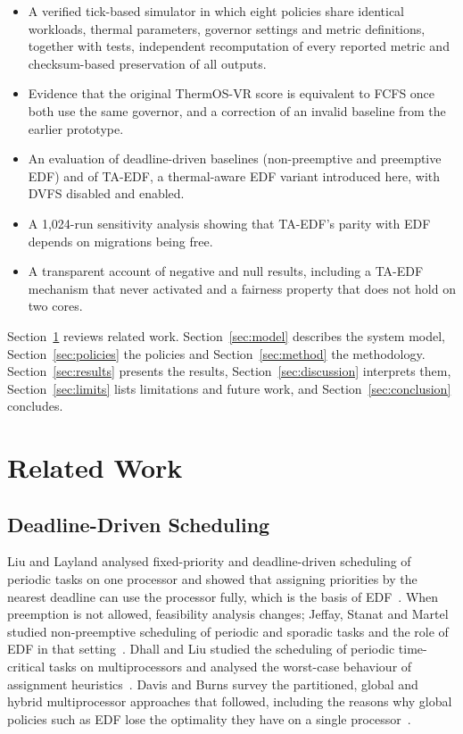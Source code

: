 \documentclass[conference]{IEEEtran}
\begin{document}
\begin{itemize}
\item A verified tick-based simulator in which eight policies share identical workloads, thermal parameters, governor settings and metric definitions, together with tests, independent recomputation of every reported metric and checksum-based preservation of all outputs.
\item Evidence that the original ThermOS-VR score is equivalent to FCFS once both use the same governor, and a correction of an invalid baseline from the earlier prototype.
\item An evaluation of deadline-driven baselines (non-preemptive and preemptive EDF) and of TA-EDF, a thermal-aware EDF variant introduced here, with DVFS disabled and enabled.
\item A 1,024-run sensitivity analysis showing that TA-EDF's parity with EDF depends on migrations being free.
\item A transparent account of negative and null results, including a TA-EDF mechanism that never activated and a fairness property that does not hold on two cores.
\end{itemize}

Section~\ref{sec:related} reviews related work. Section~\ref{sec:model} describes the system model, Section~\ref{sec:policies} the policies and Section~\ref{sec:method} the methodology. Section~\ref{sec:results} presents the results, Section~\ref{sec:discussion} interprets them, Section~\ref{sec:limits} lists limitations and future work, and Section~\ref{sec:conclusion} concludes.

\section{Related Work}\label{sec:related}
\subsection{Deadline-Driven Scheduling}\label{sec:rw-rt}
Liu and Layland analysed fixed-priority and deadline-driven scheduling of periodic tasks on one processor and showed that assigning priorities by the nearest deadline can use the processor fully, which is the basis of EDF~\cite{liu1973}. When preemption is not allowed, feasibility analysis changes; Jeffay, Stanat and Martel studied non-preemptive scheduling of periodic and sporadic tasks and the role of EDF in that setting~\cite{jeffay1991}. Dhall and Liu studied the scheduling of periodic time-critical tasks on multiprocessors and analysed the worst-case behaviour of assignment heuristics~\cite{dhall1978}. Davis and Burns survey the partitioned, global and hybrid multiprocessor approaches that followed, including the reasons why global policies such as EDF lose the optimality they have on a single processor~\cite{davis2011}.
\end{document}
